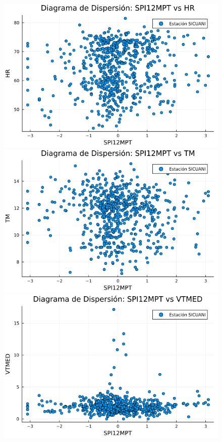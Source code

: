 \begin{figure}[htbp]
\begin{minipage}{0.32\textwidth}
    \centering
    \includegraphics[width=\linewidth]{Capitulos/Scaterplot/SICUANI_SPI12MPT_vs_HR.png}
\end{minipage}\hfill
\begin{minipage}{0.32\textwidth}
    \centering
    \includegraphics[width=\linewidth]{Capitulos/Scaterplot/SICUANI_SPI12MPT_vs_TM.png}
\end{minipage}\hfill
\begin{minipage}{0.32\textwidth}
    \centering
    \includegraphics[width=\linewidth]{Capitulos/Scaterplot/SICUANI_SPI12MPT_vs_VTMED.png}
\end{minipage}


\end{figure}
